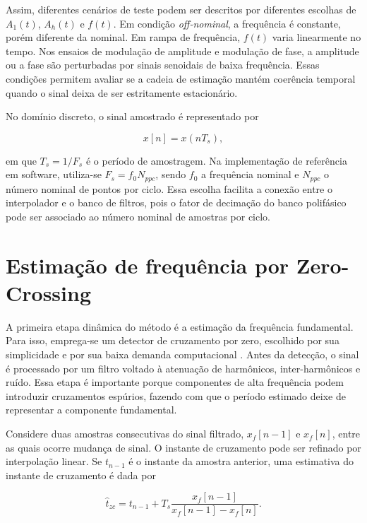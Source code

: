 Assim, diferentes cenários de teste podem ser descritos por diferentes escolhas de $A_1(t)$, $A_h(t)$ e $f(t)$. Em condição \textit{off-nominal}, a frequência é constante, porém diferente da nominal. Em rampa de frequência, $f(t)$ varia linearmente no tempo. Nos ensaios de modulação de amplitude e modulação de fase, a amplitude ou a fase são perturbadas por sinais senoidais de baixa frequência. Essas condições permitem avaliar se a cadeia de estimação mantém coerência temporal quando o sinal deixa de ser estritamente estacionário.

No domínio discreto, o sinal amostrado é representado por

\begin{equation}
x[n] = x(nT_s),
\label{eq:sinal_discreto}
\end{equation}

\noindent em que $T_s = 1/F_s$ é o período de amostragem. Na implementação de referência em software, utiliza-se $F_s = f_0N_{ppc}$, sendo $f_0$ a frequência nominal e $N_{ppc}$ o número nominal de pontos por ciclo. Essa escolha facilita a conexão entre o interpolador e o banco de filtros, pois o fator de decimação do banco polifásico pode ser associado ao número nominal de amostras por ciclo.

\section{Estimação de frequência por Zero-Crossing}

A primeira etapa dinâmica do método é a estimação da frequência fundamental. Para isso, emprega-se um detector de cruzamento por zero, escolhido por sua simplicidade e por sua baixa demanda computacional \cite{ribeiro2013}. Antes da detecção, o sinal é processado por um filtro voltado à atenuação de harmônicos, inter-harmônicos e ruído. Essa etapa é importante porque componentes de alta frequência podem introduzir cruzamentos espúrios, fazendo com que o período estimado deixe de representar a componente fundamental.

Considere duas amostras consecutivas do sinal filtrado, $x_f[n-1]$ e $x_f[n]$, entre as quais ocorre mudança de sinal. O instante de cruzamento pode ser refinado por interpolação linear. Se $t_{n-1}$ é o instante da amostra anterior, uma estimativa do instante de cruzamento é dada por

\begin{equation}
\hat{t}_{zc} = t_{n-1} + T_s \frac{x_f[n-1]}{x_f[n-1] - x_f[n]}.
\label{eq:interpolacao_zc}
\end{equation}

